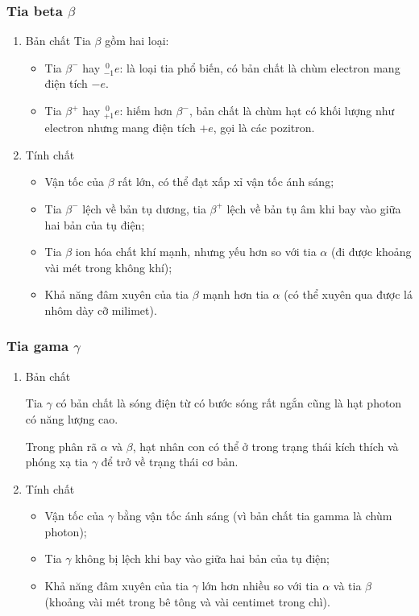 \subsubsection{Tia beta $\beta$}
	\begin{enumerate}[label=\alph*)]
		\item Bản chất
		Tia $\beta$ gồm hai loại:
		\begin{itemize}
			\item Tia $\beta^-$ hay $^{\ 0}_{-1}e$: là loại tia phổ biến, có bản chất là chùm electron mang điện tích $-e$.
			\item Tia $\beta^+$ hay $^{\ 0}_{+1}e$: hiếm hơn $\beta^-$, bản chất là chùm hạt có khối lượng như electron nhưng mang điện tích $+e$, gọi là các pozitron.
		\end{itemize}
		
		\item Tính chất
		
			\begin{itemize}
				\item Vận tốc của $\beta$ rất lớn, có thể đạt xấp xỉ vận tốc ánh sáng;
				\item Tia $\beta^-$ lệch về bản tụ dương, tia $\beta^+$ lệch về bản tụ âm khi bay vào giữa hai bản của tụ điện;
				\item Tia $\beta$ ion hóa chất khí mạnh, nhưng yếu hơn so với tia $\alpha$ (đi được khoảng vài mét trong không khí);
				\item Khả năng đâm xuyên của tia $\beta$ mạnh hơn tia $\alpha$ (có thể xuyên qua được lá nhôm dày cỡ milimet).			
			\end{itemize}
\end{enumerate}
\subsubsection{Tia gama $\gamma$}
	\begin{enumerate}[label=\alph*)]
		\item Bản chất
		
		Tia $\gamma$ có bản chất là sóng điện từ có bước sóng rất ngắn cũng là hạt photon có năng lượng cao.
		
		Trong phân rã $\alpha$ và $\beta$, hạt nhân con có thể ở trong trạng thái kích thích và phóng xạ tia $\gamma$ để trở về trạng thái cơ bản.
		
		\item Tính chất
		\begin{itemize}
			\item Vận tốc của $\gamma$ bằng vận tốc ánh sáng (vì bản chất tia gamma là chùm photon);
			\item Tia $\gamma$ không bị lệch khi bay vào giữa hai bản của tụ điện;
			\item Khả năng đâm xuyên của tia $\gamma$ lớn hơn nhiều so với tia $\alpha$ và tia $\beta$ (khoảng vài mét trong bê tông và vài centimet trong chì).
		\end{itemize}
		
	\end{enumerate}		